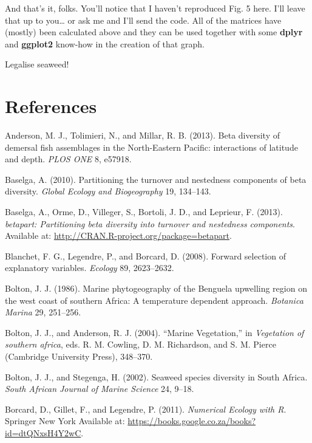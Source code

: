 \documentclass[10pt,A4,]{article}
\begin{document}
And that's it, folks. You'll notice that I haven't reproduced Fig. 5
here. I'll leave that up to you\ldots{} or ask me and I'll send the
code. All of the matrices have (mostly) been calculated above and they
can be used together with some \textbf{dplyr} and \textbf{ggplot2}
know-how in the creation of that graph.

Legalise seaweed!

\section*{References}

\hypertarget{refs}{}
\hypertarget{ref-Anderson2013}{}
Anderson, M. J., Tolimieri, N., and Millar, R. B. (2013). Beta diversity
of demersal fish assemblages in the North-Eastern Pacific: interactions
of latitude and depth. \emph{PLOS ONE} 8, e57918.

\hypertarget{ref-Baselga2010}{}
Baselga, A. (2010). Partitioning the turnover and nestedness components
of beta diversity. \emph{Global Ecology and Biogeography} 19, 134--143.

\hypertarget{ref-Baselga2013}{}
Baselga, A., Orme, D., Villeger, S., Bortoli, J. D., and Leprieur, F.
(2013). \emph{betapart: Partitioning beta diversity into turnover and
nestedness components}. Available at:
\url{http://CRAN.R-project.org/package=betapart}.

\hypertarget{ref-Blanchet2008}{}
Blanchet, F. G., Legendre, P., and Borcard, D. (2008). Forward selection
of explanatory variables. \emph{Ecology} 89, 2623--2632.

\hypertarget{ref-Bolton1986}{}
Bolton, J. J. (1986). Marine phytogeography of the Benguela upwelling
region on the west coast of southern Africa: A temperature dependent
approach. \emph{Botanica Marina} 29, 251--256.

\hypertarget{ref-Bolton2004}{}
Bolton, J. J., and Anderson, R. J. (2004). ``Marine Vegetation,'' in
\emph{Vegetation of southern africa}, eds. R. M. Cowling, D. M.
Richardson, and S. M. Pierce (Cambridge University Press), 348--370.

\hypertarget{ref-Bolton2002}{}
Bolton, J. J., and Stegenga, H. (2002). Seaweed species diversity in
South Africa. \emph{South African Journal of Marine Science} 24, 9--18.

\hypertarget{ref-Borcard2011}{}
Borcard, D., Gillet, F., and Legendre, P. (2011). \emph{Numerical
Ecology with R}. Springer New York Available at:
\url{https://books.google.co.za/books?id=dtQNxsH4Y2wC}.
\end{document}
